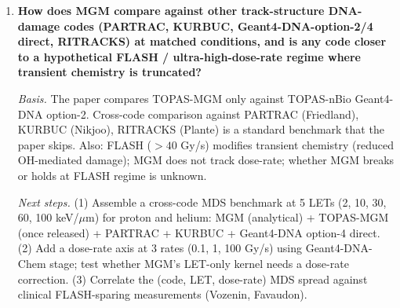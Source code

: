 \begin{enumerate}
  \item \textbf{How does MGM compare against other track-structure
    DNA-damage codes (PARTRAC, KURBUC, Geant4-DNA-option-2/4 direct,
    RITRACKS) at matched conditions, and is any code closer to a
    hypothetical FLASH / ultra-high-dose-rate regime where transient
    chemistry is truncated?}

    \emph{Basis.} The paper compares TOPAS-MGM only against TOPAS-nBio
    Geant4-DNA option-2. Cross-code comparison against PARTRAC
    (Friedland), KURBUC (Nikjoo), RITRACKS (Plante) is a standard
    benchmark that the paper skips. Also: FLASH ($>40$ Gy/s) modifies
    transient chemistry (reduced OH-mediated damage); MGM does not track
    dose-rate; whether MGM breaks or holds at FLASH regime is unknown.

    \emph{Next steps.} (1) Assemble a cross-code MDS benchmark at 5 LETs
    (2, 10, 30, 60, 100 keV/$\mu$m) for proton and helium: MGM
    (analytical) + TOPAS-MGM (once released) + PARTRAC + KURBUC +
    Geant4-DNA option-4 direct. (2) Add a dose-rate axis at 3 rates
    (0.1, 1, 100 Gy/s) using Geant4-DNA-Chem stage; test whether MGM's
    LET-only kernel needs a dose-rate correction. (3) Correlate the
    (code, LET, dose-rate) MDS spread against clinical FLASH-sparing
    measurements (Vozenin, Favaudon).
\end{enumerate}
